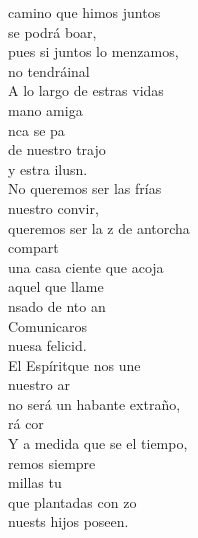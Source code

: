 \begin{cancion}%
	 camino que himos juntos\\
	 se podrá boar,\\
	pues si juntos lo menzamos,\\
	 no tendráinal\\
	A lo largo de estras vidas\\
	 mano amiga\\
	nca se pa\\
	de nuestro trajo\\
	y estra ilusn. \\
	\jump
	No queremos ser las frías\\
	 nuestro convir,\\
	queremos ser la z de antorcha\\
	 compart  \\
	una casa ciente que acoja\\
	aquel que llame\\
	nsado de nto an\\
	Comunicaros\\
	nuesa felicid.\\
	\jump
	El Espíritque nos une\\
	 nuestro ar\\
	no será un habante extraño,\\
	rá cor\\
	Y a medida que se el tiempo,\\
	remos siempre\\
	millas  tu \\
	que plantadas con zo\\
	nuests hijos poseen. \\
	\jump
\end{cancion}%
